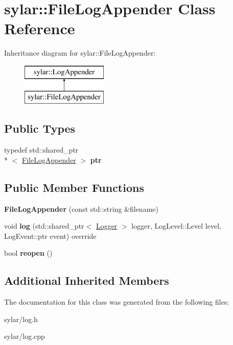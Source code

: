 \hypertarget{classsylar_1_1FileLogAppender}{\section{sylar\-:\-:File\-Log\-Appender Class Reference}
\label{classsylar_1_1FileLogAppender}
}
Inheritance diagram for sylar\-:\-:File\-Log\-Appender\-:\begin{figure}[H]
\begin{center}
\leavevmode
\includegraphics[height=2.000000cm]{classsylar_1_1FileLogAppender}
\end{center}
\end{figure}
\subsection*{Public Types}
\begin{DoxyCompactItemize}
\item 
\hypertarget{classsylar_1_1FileLogAppender_ad6b899a8bb5624637931fead3c01d0ff}{typedef std\-::shared\-\_\-ptr\\*
$<$ \hyperlink{classsylar_1_1FileLogAppender}{File\-Log\-Appender} $>$ {\bfseries ptr}}\label{classsylar_1_1FileLogAppender_ad6b899a8bb5624637931fead3c01d0ff}

\end{DoxyCompactItemize}
\subsection*{Public Member Functions}
\begin{DoxyCompactItemize}
\item 
\hypertarget{classsylar_1_1FileLogAppender_ac13a786e1d0827896acd15a9ee6d0917}{{\bfseries File\-Log\-Appender} (const std\-::string \&filename)}\label{classsylar_1_1FileLogAppender_ac13a786e1d0827896acd15a9ee6d0917}

\item 
\hypertarget{classsylar_1_1FileLogAppender_af2138b4e1f6ff6510f8d7cdce1967c05}{void {\bfseries log} (std\-::shared\-\_\-ptr$<$ \hyperlink{classsylar_1_1Logger}{Logger} $>$ logger, Log\-Level\-::\-Level level, Log\-Event\-::ptr event) override}\label{classsylar_1_1FileLogAppender_af2138b4e1f6ff6510f8d7cdce1967c05}

\item 
\hypertarget{classsylar_1_1FileLogAppender_a18a5acae7152079467b070135a67207a}{bool {\bfseries reopen} ()}\label{classsylar_1_1FileLogAppender_a18a5acae7152079467b070135a67207a}

\end{DoxyCompactItemize}
\subsection*{Additional Inherited Members}


The documentation for this class was generated from the following files\-:\begin{DoxyCompactItemize}
\item 
sylar/log.\-h\item 
sylar/log.\-cpp\end{DoxyCompactItemize}
